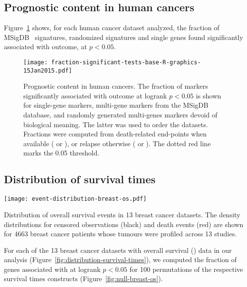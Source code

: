 \subsection{Prognostic content in human cancers}
\label{sec:results-prognostic-survival-prognostic-content}

Figure~\ref{fig:prognostic-fraction} shows, for each human cancer dataset
analyzed, the fraction of \mbox{MSigDB } signatures, randomized
signatures and single genes found significantly associated with outcome, at
$p < 0.05$.

\begin{figure}%
  \texttt{[image: fraction-significant-tests-base-R-graphics-15Jan2015.pdf]}
  \caption[Prognostic content in human cancers]{Prognostic content in human
    cancers.  The fraction of markers significantly associated with outcome at
    logrank $p<0.05$ is shown for single-gene markers, multi-gene markers from
    the \mbox{MSigDB } database, and randomly generated
    multi-genes markers devoid of biological meaning.  The latter was used to
    order the datasets. Fractions were computed from death-related end-points
    when available ( or ), or relapse otherwise
    ( or ). The dotted red line marks the 0.05
    threshold.}
  \label{fig:prognostic-fraction}%
\end{figure}

\clearpage

\subsection{Distribution of survival times}
\label{sec:results-prognostic-survival-survival-times}

\begin{marginfigure}%
  \texttt{[image: event-distribution-breast-os.pdf]}
  \caption[Distribution of overall survival events in thirteen breast cancer
  datasets]{Distribution of overall survival events in 13 breast cancer
    datasets.  The density distributions for censored observations (black) and
    death events (red) are shown for \num{4663} breast cancer patients whose
    tumours were profiled across 13 studies.}
  \label{fig:distribution-survival-times}%
\end{marginfigure}

For each of the 13 breast cancer datasets with overall survival ()
data in our analysis (Figure~\ref{fig:distribution-survival-times}), we computed
the fraction of genes associated with  at logrank $p < 0.05$ for
\num{100} permutations of the respective survival times constructs
(Figure~\ref{fig:null-breast-os}).

